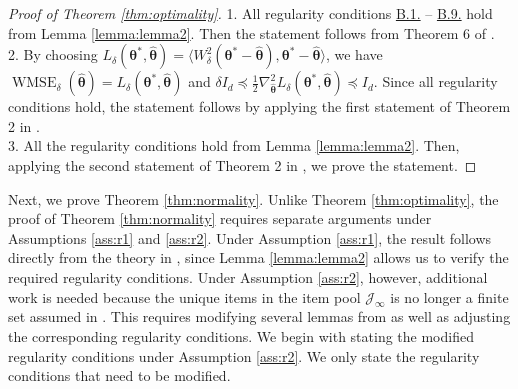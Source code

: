\documentclass[12pt]{article}
\newcommand{\bftheta}{\boldsymbol{\theta}}
\begin{document}
\begin{proof}[Proof of Theorem \ref{thm:optimality}]
1. All regularity conditions \hyperref[c:c1]{B.1.} -- \hyperref[c:c7b]{B.9.} hold from Lemma \ref{lemma:lemma2}. Then the statement follows from Theorem 6 of .
\\ 2. By choosing $L_{\delta}(\bftheta^{\ast}, \hat{\bftheta}) = \langle W_{\delta}^2(\bftheta^{\ast} - \hat{\bftheta}), \bftheta^{\ast} - \hat{\bftheta} \rangle$, we have $\operatorname{WMSE}_{\delta}(\hat{\bftheta}) = L_{\delta}(\bftheta^{\ast}, \hat{\bftheta})$ and $\delta I_d \preceq \frac{1}{2} \nabla_{\hat{\bftheta}}^2 L_{\delta}(\bftheta^{\ast}, \hat{\bftheta}) \preceq I_d$. Since all regularity conditions hold, the statement follows by applying the first statement of Theorem 2 in .
\\ 3. All the regularity conditions hold from Lemma \ref{lemma:lemma2}. Then, applying the second statement of Theorem 2 in , we prove the statement.
\end{proof}

Next, we prove Theorem \ref{thm:normality}.
Unlike Theorem \ref{thm:optimality}, the proof of Theorem \ref{thm:normality}
requires separate arguments under Assumptions \ref{ass:r1} and \ref{ass:r2}.
Under Assumption \ref{ass:r1}, the result follows directly from the theory in
, since Lemma \ref{lemma:lemma2} allows us to verify the
required regularity conditions.
Under Assumption \ref{ass:r2}, however, additional work is needed because the
unique items in the item pool $\mathcal{J}_{\infty}$ is no longer a finite set assumed in . This requires modifying several lemmas from  as well as adjusting the corresponding regularity conditions. We begin with stating the modified regularity conditions under Assumption \ref{ass:r2}. We only state the regularity conditions that need to be modified.
\end{document}
